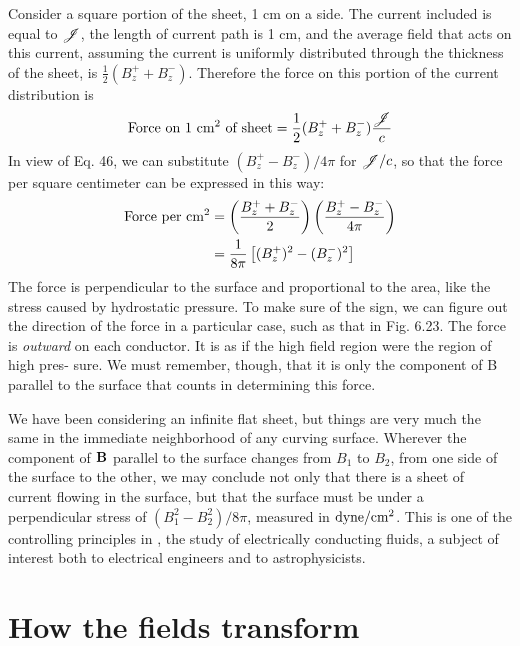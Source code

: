 Consider a square portion of the sheet, 1 cm on a side. The current
included is equal to $\mathscr{J}$, the length of current path is 1 cm, and the
average field that acts on this current, assuming the current is uniformly
distributed through the thickness of the sheet, is $\frac{1}{2}(B_z^++B_z^-)$.
Therefore the force on this portion of the current distribution is
\begin{equation}
  \text{Force on 1 $\textup{cm}^2$ of sheet} = \frac{1}{2}(B_z^++B_z^-)\frac{\mathscr{J}}{c}
\end{equation}
In view of Eq. 46, we can substitute $(B_z^+-B_z^-)/4\pi$ for $\mathscr{J}/c$, so that
the force per square centimeter can be expressed in this way:
\begin{align}
\begin{split}
  \text{Force per $\textup{cm}^2$}
       & = \left(\frac{B_z^++B_z^-}{2}\right)\left(\frac{B_z^+-B_z^-}{4\pi}\right) \\
       &= \frac{1}{8\pi} \left[(B_z^+)^2-(B_z^-)^2\right]
\end{split}
\end{align}
The force is perpendicular to the surface and proportional to the
area, like the stress caused by hydrostatic pressure. To make sure
of the sign, we can figure out the direction of the force in a particular
case, such as that in Fig. 6.23. The force is \emph{outward} on each conductor.
It is as if the high field region were the region of high pres-
sure. We must remember, though, that it is only the component of
B parallel to the surface that counts in determining this force.

We have been considering an infinite flat sheet, but things are very
much the same in the immediate neighborhood of any curving
surface. Wherever the component of $\mathbf{B}$ parallel to the surface
changes from $B_1$ to $B_2$, from one side of the surface to the other, we
may conclude not only that there is a sheet of current flowing in the
surface, but that the surface must be under a perpendicular stress of
$(B_1^2-B_2^2)/8\pi$, measured in $\textup{dyne}/\textup{cm}^2$. This is one of the controlling
principles in , the study of electrically
conducting fluids, a subject of interest both to electrical engineers
and to astrophysicists.

\section{How the fields transform}

